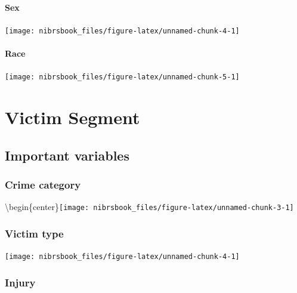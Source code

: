 \documentclass[
  12pt,
  openany]{book}
\begin{document}
\hypertarget{sex}{%
\subsubsection{Sex}\label{sex}}

\begin{center}\texttt{[image: nibrsbook\_files/figure-latex/unnamed-chunk-4-1]} \end{center}

\hypertarget{race}{%
\subsubsection{Race}\label{race}}

\begin{center}\texttt{[image: nibrsbook\_files/figure-latex/unnamed-chunk-5-1]} \end{center}

\hypertarget{victim-segment}{%
\chapter{Victim Segment}\label{victim-segment}}

\hypertarget{important-variables-3}{%
\section{Important variables}\label{important-variables-3}}

\hypertarget{crime-category-1}{%
\subsection{Crime category}\label{crime-category-1}}

\textbackslash begin\{center\}\texttt{[image: nibrsbook\_files/figure-latex/unnamed-chunk-3-1]}

\hypertarget{victim-type}{%
\subsection{Victim type}\label{victim-type}}

\begin{center}\texttt{[image: nibrsbook\_files/figure-latex/unnamed-chunk-4-1]} \end{center}

\hypertarget{injury}{%
\subsection{Injury}\label{injury}}
\end{document}
